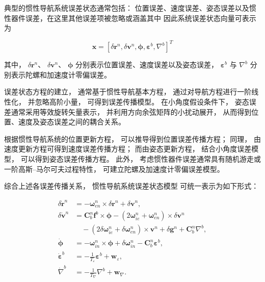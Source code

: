 典型的惯性导航系统误差状态通常包括：
位置误差、速度误差、姿态误差以及惯性器件误差，在这里其他误差项被忽略或涵盖其中
因此系统误差状态向量可表示为

\begin{equation}
\mathbf{x}
=
[
\delta \mathbf{r}^n,
\delta \mathbf{v}^n,
\boldsymbol{\phi},
\boldsymbol{\varepsilon}^b,
\nabla^b
]^T
\end{equation}

其中，
$\delta \mathbf{r}^n$、
$\delta \mathbf{v}^n$、
$\boldsymbol{\phi}$
分别表示位置误差、速度误差以及姿态误差，
$\boldsymbol{\varepsilon}^b$
与 $\nabla^b$
分别表示陀螺和加速度计零偏误差。

误差状态方程的建立，
通常基于惯性导航基本方程，
通过对导航方程进行一阶线性化，
并忽略高阶小量，
可得到误差传播模型。
在小角度假设条件下，
姿态误差通常采用等效旋转矢量表示，
并利用方向余弦矩阵的小扰动展开，
从而得到位置、速度及姿态误差之间的耦合关系。

根据惯性导航系统的位置更新方程，
可以推导得到位置误差传播方程；
同理，
由速度更新方程可得到速度误差传播方程；
而由姿态更新方程，
结合小角度误差模型，
可以得到姿态误差传播方程。
此外，
考虑惯性器件误差通常具有随机游走或一阶高斯–马尔可夫过程特性，
可建立陀螺及加速度计零偏误差模型。

综合上述各误差传播关系，
惯性导航系统误差状态模型
可统一表示为如下形式：

\begin{equation}
\begin{aligned}
\delta \dot{\mathbf{r}}^n
&= -\boldsymbol{\omega}_{en}^n \times \delta \mathbf{r}^n + \delta \mathbf{v}^n, \\
\delta \dot{\mathbf{v}}^n
&= \mathbf{C}_b^n \mathbf{f}^b \times \boldsymbol{\phi}
	- (2\boldsymbol{\omega}_{ie}^n + \boldsymbol{\omega}_{en}^n) \times \delta \mathbf{v}^n \\
&\quad - (2\delta \boldsymbol{\omega}_{ie}^n + \delta \boldsymbol{\omega}_{en}^n) \times \mathbf{v}^n
	+ \delta \mathbf{g}^n + \mathbf{C}_b^n \nabla^b, \\
\dot{\boldsymbol{\phi}}
&= -\boldsymbol{\omega}_{in}^n \times \boldsymbol{\phi}
	+ \delta \boldsymbol{\omega}_{in}^n - \mathbf{C}_b^n \boldsymbol{\varepsilon}^b, \\
\dot{\boldsymbol{\varepsilon}}^b
&= -\frac{1}{T_{\varepsilon}}\boldsymbol{\varepsilon}^b + \mathbf{w}_{\varepsilon}, \\
\dot{\nabla}^b
&= -\frac{1}{T_{\nabla}}\nabla^b + \mathbf{w}_{\nabla}.
\end{aligned}
\end{equation}

